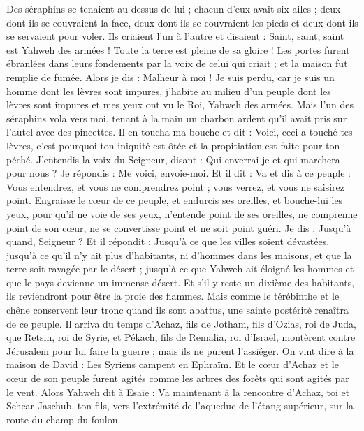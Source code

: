 \begin{multicols}{2}
Des séraphins se tenaient au-dessus de lui ; chacun d'eux avait six ailes ; deux dont ils se couvraient la face, deux dont ils se couvraient les pieds et deux dont ils se servaient pour voler.
Ils criaient l'un à l'autre et disaient : Saint, saint, saint est Yahweh des armées ! Toute la terre est pleine de sa gloire !
Les portes furent ébranlées dans leurs fondements par la voix de celui qui criait ; et la maison fut remplie de fumée.
Alors je dis : Malheur à moi ! Je suis perdu, car je suis un homme dont les lèvres sont impures, j'habite au milieu d'un peuple dont les lèvres sont impures et mes yeux ont vu le Roi, Yahweh des armées.
Mais l'un des séraphins vola vers moi, tenant à la main un charbon ardent qu'il avait pris sur l'autel avec des pincettes.
Il en toucha ma bouche et dit : Voici, ceci a touché tes lèvres, c'est pourquoi ton iniquité est ôtée et la propitiation est faite pour ton péché.
J'entendis la voix du Seigneur, disant : Qui enverrai-je et qui marchera pour nous ? Je répondis : Me voici, envoie-moi.
Et il dit : Va et dis à ce peuple : Vous entendrez, et vous ne comprendrez point ; vous verrez, et vous ne saisirez point.
Engraisse le cœur de ce peuple, et endurcis ses oreilles, et bouche-lui les yeux, pour qu'il ne voie de ses yeux, n'entende point de ses oreilles, ne comprenne point de son cœur, ne se convertisse point et ne soit point guéri.
Je dis : Jusqu'à quand, Seigneur ? Et il répondit : Jusqu'à ce que les villes soient dévastées, jusqu'à ce qu'il n'y ait plus d'habitants, ni d'hommes dans les maisons, et que la terre soit ravagée par le désert ;
jusqu'à ce que Yahweh ait éloigné les hommes et que le pays devienne un immense désert.
Et s'il y reste un dixième des habitants, ils reviendront pour être la proie des flammes. Mais comme le térébinthe et le chêne conservent leur tronc quand ils sont abattus, une sainte postérité renaîtra de ce peuple.
\VerseOne{}Il arriva du temps d'Achaz, fils de Jotham, fils d'Ozias, roi de Juda, que Retsin, roi de Syrie, et Pékach, fils de Remalia, roi d'Israël, montèrent contre Jérusalem pour lui faire la guerre ; mais ils ne purent l'assiéger.
On vint dire à la maison de David : Les Syriens campent en Ephraïm. Et le cœur d'Achaz et le cœur de son peuple furent agités comme les arbres des forêts qui sont agités par le vent.
Alors Yahweh dit à Esaïe : Va maintenant à la rencontre d'Achaz, toi et Schear-Jaschub, ton fils, vers l'extrémité de l'aqueduc de l'étang supérieur, sur la route du champ du foulon.

\end{multicols}
